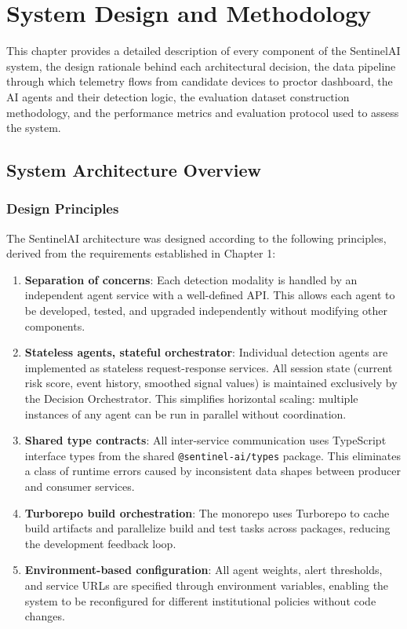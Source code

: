 \chapter{System Design and Methodology}
\thispagestyle{empty}

This chapter provides a detailed description of every component of the SentinelAI system, the design rationale behind each architectural decision, the data pipeline through which telemetry flows from candidate devices to proctor dashboard, the AI agents and their detection logic, the evaluation dataset construction methodology, and the performance metrics and evaluation protocol used to assess the system.

\section{System Architecture Overview}

\subsection{Design Principles}

The SentinelAI architecture was designed according to the following principles, derived from the requirements established in Chapter 1:

\begin{enumerate}
    \item \textbf{Separation of concerns}: Each detection modality is handled by an independent agent service with a well-defined API. This allows each agent to be developed, tested, and upgraded independently without modifying other components.
    \item \textbf{Stateless agents, stateful orchestrator}: Individual detection agents are implemented as stateless request-response services. All session state (current risk score, event history, smoothed signal values) is maintained exclusively by the Decision Orchestrator. This simplifies horizontal scaling: multiple instances of any agent can be run in parallel without coordination.
    \item \textbf{Shared type contracts}: All inter-service communication uses TypeScript interface types from the shared \texttt{@sentinel-ai/types} package. This eliminates a class of runtime errors caused by inconsistent data shapes between producer and consumer services.
    \item \textbf{Turborepo build orchestration}: The monorepo uses Turborepo to cache build artifacts and parallelize build and test tasks across packages, reducing the development feedback loop.
    \item \textbf{Environment-based configuration}: All agent weights, alert thresholds, and service URLs are specified through environment variables, enabling the system to be reconfigured for different institutional policies without code changes.
\end{enumerate}

